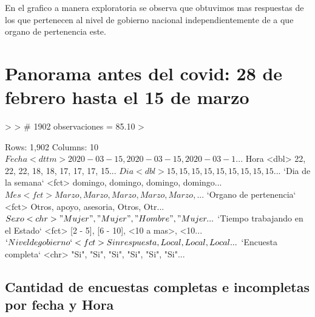 \documentclass{article}
\begin{document}
En el grafico a manera exploratoria se observa que obtuvimos mas respuestas de los que pertenecen al nivel de gobierno nacional independientemente de a que organo de pertenencia este.

\section{Panorama antes del covid: 28 de febrero hasta el 15 de marzo }

\begin{Schunk}
\begin{Sinput}
> 
> # 1902 observaciones = 85.10%
> 
\end{Sinput}
\end{Schunk}


\begin{Schunk}
\begin{Soutput}
Rows: 1,902
Columns: 10
$ Fecha                            <dttm> 2020-03-15, 2020-03-15, 2020-03-1...
$ Hora                             <dbl> 22, 22, 22, 18, 18, 17, 17, 17, 15...
$ Dia                              <dbl> 15, 15, 15, 15, 15, 15, 15, 15, 15...
$ `Dia de la semana`               <fct> domingo, domingo, domingo, domingo...
$ Mes                              <fct> Marzo, Marzo, Marzo, Marzo, Marzo,...
$ `Organo de pertenencia`          <fct> Otros, apoyo, asesoria, Otros, Otr...
$ Sexo                             <chr> "Mujer", "Mujer", "Hombre", "Mujer...
$ `Tiempo trabajando en el Estado` <fct> [2 - 5], [6 - 10], <10 a mas>, <10...
$ `Nivel de gobierno`              <fct> Sin respuesta, Local, Local, Local...
$ `Encuesta completa`              <chr> "Si", "Si", "Si", "Si", "Si", "Si"...
\end{Soutput}
\end{Schunk}


\subsection{Cantidad de encuestas completas e incompletas por fecha y Hora}
\end{document}
